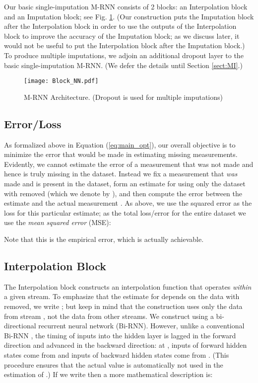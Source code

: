\documentclass{article}
\begin{document}
	Our basic single-imputation M-RNN consists of 2 blocks: an Interpolation block  and an Imputation block; see Fig. \ref{fig:Block_Time}. (Our construction puts the Imputation block after the Interpolation block in order to use the outputs of the Interpolation block to improve the accuracy of the Imputation block; as we discuss later, it would not be useful to put the Interpolation block after the Imputation block.) To produce multiple imputations, we adjoin an additional dropout layer to the basic single-imputation M-RNN.  (We defer the details until Section \ref{sect:MI}.) 
	
	\begin{figure}[t!]
    	\center
		\texttt{[image: Block\_NN.pdf]}
		\caption{M-RNN Architecture. (Dropout is used for multiple imputations)}
		\label{fig:Block_Time}
	\end{figure}
	
	\subsection{Error/Loss } As formalized above  in Equation (\ref{eq:main_opt}), our overall objective is to minimize the error that would be made in estimating missing measurements. Evidently, we cannot estimate the error of a measurement that was not made and hence is truly missing in the dataset. Instead we fix a measurement  that {\em was} made and is present in the dataset, form an estimate  for  using only the dataset with  removed (which we denote by ), and then compute the error between the estimate  and the actual measurement .  As above, we use the squared error  as the loss for this particular estimate; as  the total  loss/error for the entire dataset  we use the {\em mean squared error} (MSE):
	
    Note that this is the empirical error, which is actually achievable.
		
	\subsection{Interpolation Block } The Interpolation block constructs an interpolation function 
	 that operates {\em within} a given stream. To emphasize that the estimate  for  depends on the data with  removed, we write ; but keep in mind that the construction uses  only  the data from stream ,  not the data from other streams.  We construct
	 using a bi-directional recurrent neural network (Bi-RNN).  However, unlike a conventional Bi-RNN \cite{BiRNN}, the timing of inputs into the hidden layer is lagged in the forward direction and advanced in the backward direction: at ,  inputs of forward hidden states come from  and inputs of backward hidden states come from . (This procedure ensures that the actual value   is automatically not used in the estimation of .) If we write  then a more mathematical description is:
	
\end{document}
